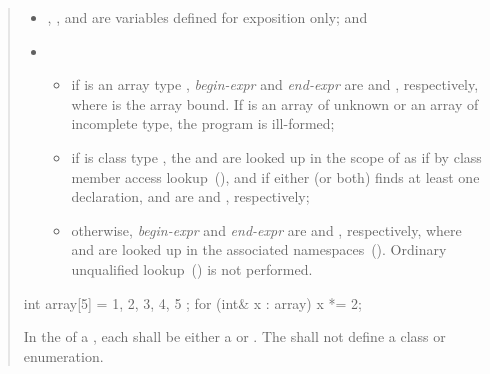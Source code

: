 \begin{quote}
\begin{itemize}
\item
{}, , and  are variables defined for
exposition only; and 

\item
{}

\begin{itemize}
\item
if  is an
 array type , \textit{begin-expr} and \textit{end-expr} are
 and , respectively, where  is
the array bound. If  is an array of unknown
 or an array of incomplete type, the program is ill-formed;

\item
if  is
 class type , the
  and  are looked up in
the scope of  as if by class
member access lookup~(), and if either
(or both) finds at least one declaration,  and
 are  and ,
respectively;

\item
otherwise, \textit{begin-expr} and \textit{end-expr} are 
and , respectively, where  and  are looked
up in the associated namespaces~().
\enternote Ordinary unqualified lookup~() is not
performed. \exitnote
\end{itemize}
\end{itemize}

\enterexample
\begin{codeblock}
int array[5] = { 1, 2, 3, 4, 5 };
for (int& x : array)
  x *= 2;
\end{codeblock}
\exitexample%

\pnum
In the  of a ,
each  shall be either a 
or . The  shall not define a
class or enumeration.
\end{quote}
